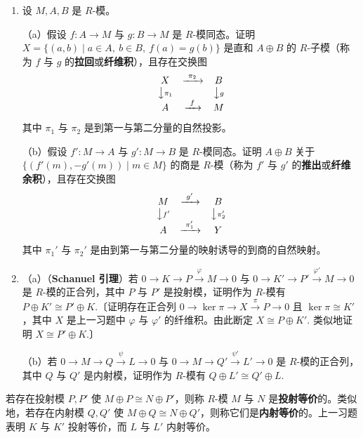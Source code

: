 \begin{enumerate}
\item 设 \(M, A, B\) 是 \(R\)-模。

（a）假设 \(f : A \to M\) 与 \(g : B \to M\) 是 \(R\)-模同态。证明 \(X = \{(a, b) \mid a \in A,\ b \in B,\ f(a) = g(b)\}\) 是直和 \(A \oplus B\) 的 \(R\)-子模（称为 \(f\) 与 \(g\) 的\textbf{拉回}或\textbf{纤维积}），且存在交换图
\[
\begin{array}{ccc}
X & \xrightarrow{\ \pi_2\ } & B\\
\big\downarrow{\scriptstyle\pi_1} & & \big\downarrow{\scriptstyle g}\\
A & \xrightarrow{\ f\ } & M
\end{array}
\]
其中 \(\pi_1\) 与 \(\pi_2\) 是到第一与第二分量的自然投影。

（b）假设 \(f' : M \to A\) 与 \(g' : M \to B\) 是 \(R\)-模同态。证明 \(A \oplus B\) 关于 \(\{(f'(m), -g'(m)) \mid m \in M\}\) 的商是 \(R\)-模（称为 \(f'\) 与 \(g'\) 的\textbf{推出}或\textbf{纤维余积}），且存在交换图
\[
\begin{array}{ccc}
M & \xrightarrow{\ g'\ } & B\\
\big\downarrow{\scriptstyle f'} & & \big\downarrow{\scriptstyle \pi_2'}\\
A & \xrightarrow{\ \pi_1'\ } & Y
\end{array}
\]
其中 \(\pi_1'\) 与 \(\pi_2'\) 是由到第一与第二分量的映射诱导的到商的自然映射。

\item （a）（\textbf{Schanuel 引理}）若 \(0 \to K \to P \xrightarrow{\varphi} M \to 0\) 与 \(0 \to K' \to P' \xrightarrow{\varphi'} M \to 0\) 是 \(R\)-模的正合列，其中 \(P\) 与 \(P'\) 是投射模，证明作为 \(R\)-模有 \(P \oplus K' \cong P' \oplus K\).〔证明存在正合列 \(0 \to \ker\pi \to X \xrightarrow{\pi} P \to 0\) 且 \(\ker\pi \cong K'\)，其中 \(X\) 是上一习题中 \(\varphi\) 与 \(\varphi'\) 的纤维积。由此断定 \(X \cong P \oplus K'\). 类似地证明 \(X \cong P' \oplus K\).〕

（b）若 \(0 \to M \to Q \xrightarrow{\psi} L \to 0\) 与 \(0 \to M \to Q' \xrightarrow{\psi'} L' \to 0\) 是 \(R\)-模的正合列，其中 \(Q\) 与 \(Q'\) 是内射模，证明作为 \(R\)-模有 \(Q \oplus L' \cong Q' \oplus L\).
\end{enumerate}

\noindent 若存在投射模 \(P, P'\) 使 \(M \oplus P \cong N \oplus P'\)，则称 \(R\)-模 \(M\) 与 \(N\) 是\textbf{投射等价}的。类似地，若存在内射模 \(Q, Q'\) 使 \(M \oplus Q \cong N \oplus Q'\)，则称它们是\textbf{内射等价}的。上一习题表明 \(K\) 与 \(K'\) 投射等价，而 \(L\) 与 \(L'\) 内射等价。
